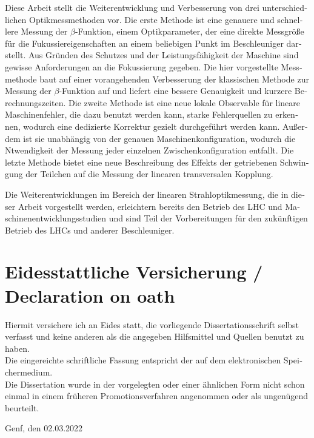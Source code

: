\foreignlanguage{ngerman}{
Diese Arbeit stellt die Weiterentwicklung und Verbesserung von drei unterschiedlichen Optikmessmethoden vor.
Die erste Methode ist eine genauere und schnellere Messung der $\beta$-Funktion, einem Optikparameter,
der eine direkte Messgröße für die Fukussiereigenschaften an einem beliebigen Punkt im Beschleuniger darstellt.
Aus Gründen des Schutzes und der Leistungsfähigkeit der Maschine sind gewisse Anforderungen an die Fokussierung gegeben.
Die hier vorgestellte Messmethode baut auf einer vorangehenden Verbesserung der klassischen Methode zur Messung der $\beta$-Funktion auf
und liefert eine bessere Genauigkeit und k\:urzere Berechnungszeiten.
Die zweite Methode ist eine neue lokale Observable für lineare Maschinenfehler, die dazu benutzt werden kann, starke Fehlerquellen zu erkennen,
wodurch eine dedizierte Korrektur gezielt durchgeführt werden kann. Außerdem ist sie unabhängig von der
genauen Maschinenkonfiguration, wodurch die Ntwendigkeit der Messung jeder einzelnen Zwischenkonfiguration entf\:allt.
Die letzte Methode bietet eine neue Beschreibung des Effekts der getriebenen Schwingung der Teilchen auf die Messung der linearen transversalen Kopplung.
}

\foreignlanguage{ngerman}{
Die Weiterentwicklungen im Bereich der linearen Strahloptikmessung, die in dieser Arbeit vorgestellt werden,
erleichtern bereits den Betrieb des LHC und Maschinenentwicklungsstudien und sind Teil der Vorbereitungen für
den zukünftigen Betrieb des LHCs und anderer Beschleuniger.
}

\cleardoublepage
\thispagestyle{empty}
\section*{Eidesstattliche Versicherung / Declaration on oath}

\foreignlanguage{german}{
Hiermit versichere ich an Eides statt, die vorliegende Dissertationsschrift selbst verfasst und
keine anderen als die angegeben Hilfsmittel und Quellen benutzt zu haben.\\[1.5em]
Die eingereichte schriftliche Fassung entspricht der auf dem elektronischen Speichermedium.\\[1.5em]
Die Dissertation wurde in der vorgelegten oder einer ähnlichen Form nicht schon einmal in einem früheren Promotionsverfahren angenommen oder als ungenügend beurteilt.
\vspace{6em}
}

\noindent Genf, den 02.03.2022
\hfill
{}

\hfill \raisebox{1.0em}{Unterschrift des Doktoranden}

\cleardoublepage


\tableofcontents
\cleardoublepage
